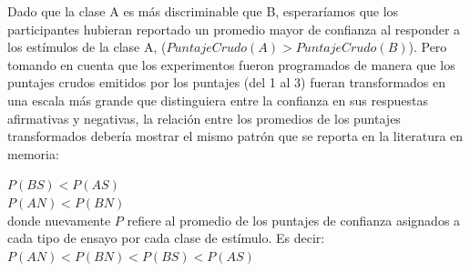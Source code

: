 \begin{enumerate}
Dado que la clase A es más discriminable que B, esperaríamos que los participantes hubieran reportado un promedio mayor de confianza al responder a los estímulos de la clase A, ($PuntajeCrudo(A) > PuntajeCrudo(B)$). Pero tomando en cuenta que los experimentos fueron programados de manera que los puntajes crudos emitidos por los puntajes (del 1 al 3) fueran transformados en una escala más grande que distinguiera entre la confianza en sus respuestas afirmativas y negativas, la relación entre los promedios de los puntajes transformados debería mostrar el mismo patrón que se reporta en la literatura en memoria:





\begin{center}
$P(BS) < P(AS)$\\
$P(AN) < P(BN)$\\
donde nuevamente $P$ refiere al promedio de los puntajes de confianza asignados a cada tipo de ensayo por cada clase de estímulo. Es decir:\\
$P(AN) < P(BN) < P(BS) < P(AS)$\\
\end{center}


\end{enumerate}

